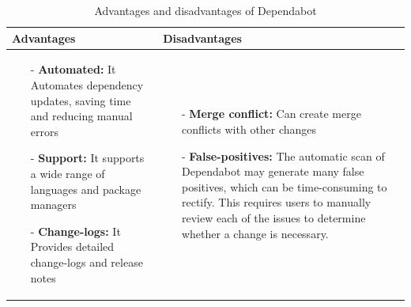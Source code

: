 \begin{table}[H]
\centering
\begin{tabular}{|>{\raggedright\arraybackslash}p{6cm}|>{\raggedright\arraybackslash}p{6cm}|}
\hline
\textbf{Advantages} & \textbf{Disadvantages} \\
\hline
\begin{itemize}
\item [-]\textbf{Automated:} It Automates dependency updates, saving time and reducing manual errors 
\item [-] \textbf{Support:} It supports a wide range of languages and package managers 
\item [-]\textbf{Change-logs:} It Provides detailed change-logs and release notes 
\end{itemize}
&
\begin{itemize}
\item [-] \textbf{Merge conflict:} Can create merge conflicts with other changes 
\item [-] \textbf{False-positives:} The automatic scan of Dependabot may generate many false positives, which can be time-consuming to rectify. This requires users to manually review each of the issues to determine whether a change is necessary. 

\end{itemize}
\\
\hline
\end{tabular}
\caption{Advantages and disadvantages of Dependabot}
\label{tab:dependabot}
\end{table}

